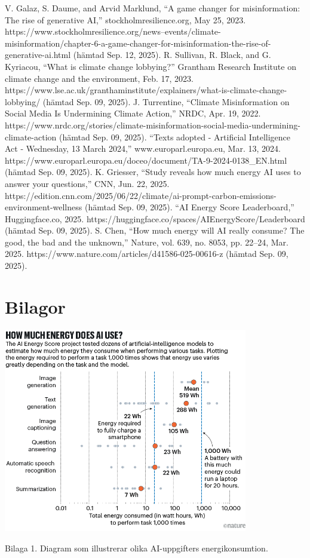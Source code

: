\documentclass[conference]{IEEEtran}
\begin{document}
\begin{thebibliography}{00}
V. Galaz, S. Daume, and Arvid Marklund, “A game changer for misinformation: The rise of generative AI,” stockholmresilience.org, May 25, 2023. https://www.stockholmresilience.org/news--events/climate-misinformation/chapter-6-a-game-changer-for-misinformation-the-rise-of-generative-ai.html (hämtad Sep. 12, 2025). 
R. Sullivan, R. Black, and G. Kyriacou, “What is climate change lobbying?” Grantham Research Institute on climate change and the environment, Feb. 17, 2023. https://www.lse.ac.uk/granthaminstitute/explainers/what-is-climate-change-lobbying/ (hämtad Sep. 09, 2025). 
J. Turrentine, “Climate Misinformation on Social Media Is Undermining Climate Action,” NRDC, Apr. 19, 2022. https://www.nrdc.org/stories/climate-misinformation-social-media-undermining-climate-action (hämtad Sep. 09, 2025). 
“Texts adopted - Artificial Intelligence Act - Wednesday, 13 March 2024,” www.europarl.europa.eu, Mar. 13, 2024. https://www.europarl.europa.eu/doceo/document/TA-9-2024-0138\_EN.html (hämtad Sep. 09, 2025). 
K. Griesser, “Study reveals how much energy AI uses to answer your questions,” CNN, Jun. 22, 2025. https://edition.cnn.com/2025/06/22/climate/ai-prompt-carbon-emissions-environment-wellness (hämtad Sep. 09, 2025). 
“AI Energy Score Leaderboard,” Huggingface.co, 2025. https://huggingface.co/spaces/AIEnergyScore/Leaderboard (hämtad Sep. 09, 2025). 
S. Chen, “How much energy will AI really consume? The good, the bad and the unknown,” Nature, vol. 639, no. 8053, pp. 22–24, Mar. 2025. https://www.nature.com/articles/d41586-025-00616-z (hämtad Sep. 09, 2025).
\end{thebibliography}

\cleardoublepage
\onecolumn
\section*{Bilagor}
\vspace{8ex}
\centerline{\includegraphics[width=0.8\textwidth]{bilaga1.png}}
\centerline{Bilaga 1. Diagram som illustrerar olika AI-uppgifters energikonsumtion.}
\end{document}
